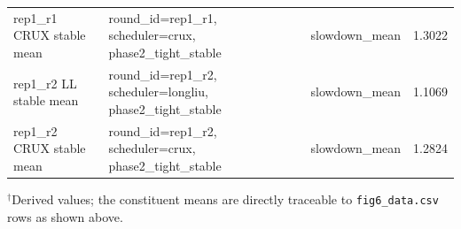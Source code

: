 \begin{table}[htbp]
\begin{tabular}{lllr}
rep1\_r1 CRUX stable mean & round\_id=rep1\_r1, scheduler=crux, phase2\_tight\_stable & slowdown\_mean & 1.3022\\
rep1\_r2 LL stable mean & round\_id=rep1\_r2, scheduler=longliu, phase2\_tight\_stable & slowdown\_mean & 1.1069\\
rep1\_r2 CRUX stable mean & round\_id=rep1\_r2, scheduler=crux, phase2\_tight\_stable & slowdown\_mean & 1.2824\\
\bottomrule
\end{tabular}
\vspace{2pt}
\raggedfootnote
${}^{\dagger}$Derived values; the constituent means are directly traceable
to \texttt{fig6\_data.csv} rows as shown above.
\end{table}
